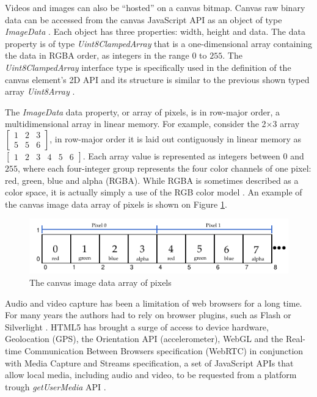  Videos and images can also be ``hosted'' on a canvas bitmap. Canvas raw binary data can be accessed from the canvas JavaScript API as an object of type \textit{ImageData} \cite{Canvas2013}. Each object has three properties: width, height and data. The data property is of type \textit{Uint8ClampedArray} that is a one-dimensional array containing the data in RGBA order, as integers in the range $0$ to $255$. The \textit{Uint8ClampedArray} interface type is specifically used in the definition of the canvas element's 2D API and its structure is  similar to the previous shown typed array \textit{Uint8Array} \cite{Canvas2013} \cite{TypedArray2013}.

The \textit{ImageData} data property, or array of pixels, is in row-major order, a multidimensional array in linear memory. For example, consider the 2×3 array $\begin{bmatrix}
1 & 2 & 3\\
5 & 5 & 6
\end{bmatrix}$, in row-major order it is laid out contiguously in linear memory as $\begin{bmatrix}
1 & 2 & 3 & 4 & 5 & 6
\end{bmatrix}$. Each array value is represented as integers between $0$ and $255$, where each four-integer group represents the four color channels of one pixel: red, green, blue and alpha (RGBA). While RGBA is sometimes described as a color space, it is actually simply a use of the RGB color model \cite{Gonzalez2007}. An example of the canvas image data array of pixels is shown on Figure \ref{figure:imagedata_array}.

\begin{figure}[!htb]
  \centering
  \includegraphics[width=\linewidth]{chapters/basic_concepts/imagedata_array.pdf}
  \caption{The canvas image data array of pixels}
  \label{figure:imagedata_array}
\end{figure}

Audio and video capture has been a limitation of web browsers for a long time. For many years the authors had to rely on browser plugins, such as Flash \cite{Flash2013} or Silverlight \cite{Silverlight2013} \cite{Rocks2013}. HTML5 \cite{Hickson2013} has brought a surge of access to device hardware, Geolocation (GPS), the Orientation API (accelerometer), WebGL \cite{WebGL2013} and the Real-time Communication Between Browsers specification (WebRTC) in conjunction with Media Capture and Streams specification, a set of JavaScript APIs that allow local media, including audio and video, to be requested from a platform trough \textit{getUserMedia} API \cite{WC2006}.

